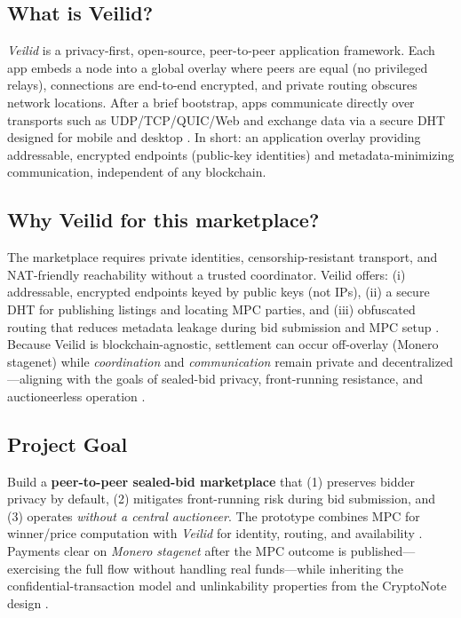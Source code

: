 \documentclass[12pt,a4paper]{article}
\begin{document}
\subsection*{What is Veilid?}
\emph{Veilid} is a privacy-first, open-source, peer-to-peer application framework. Each app embeds a node into a global overlay where peers are equal (no privileged relays), connections are end-to-end encrypted, and private routing obscures network locations. After a brief bootstrap, apps communicate directly over transports such as UDP/TCP/QUIC/Web and exchange data via a secure DHT designed for mobile and desktop \parencite{veilid_developer_book}. In short: an application overlay providing addressable, encrypted endpoints (public-key identities) and metadata-minimizing communication, independent of any blockchain.

\subsection*{Why Veilid for this marketplace?}
The marketplace requires private identities, censorship-resistant transport, and NAT-friendly reachability without a trusted coordinator. Veilid offers: (i) addressable, encrypted endpoints keyed by public keys (not IPs), (ii) a secure DHT for publishing listings and locating MPC parties, and (iii) obfuscated routing that reduces metadata leakage during bid submission and MPC setup \parencite{veilid_developer_book}. Because Veilid is blockchain-agnostic, settlement can occur off-overlay (Monero stagenet) while \emph{coordination} and \emph{communication} remain private and decentralized—aligning with the goals of sealed-bid privacy, front-running resistance, and auctioneerless operation \parencite{cryptonote2013_whitepaper}.

\subsection*{Project Goal}
Build a \textbf{peer-to-peer sealed-bid marketplace} that (1) preserves bidder privacy by default, (2) mitigates front-running risk during bid submission, and (3) operates \emph{without a central auctioneer}. The prototype combines MPC for winner/price computation with \emph{Veilid} for identity, routing, and availability \parencite{veilid_developer_book}. Payments clear on \emph{Monero stagenet} after the MPC outcome is published—exercising the full flow without handling real funds—while inheriting the confidential-transaction model and unlinkability properties from the CryptoNote design \parencite{cryptonote2013_whitepaper}.
\end{document}
